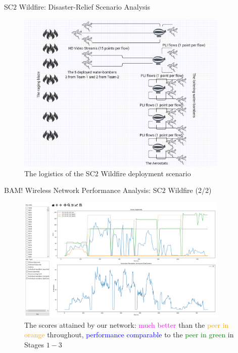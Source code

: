 \documentclass{beamer}
\begin{document}
\begin{frame}{SC$2$ Wildfire: Disaster-Relief Scenario Analysis}
    \begin{figure}
    \centering
    \includegraphics[width = 0.90\textwidth]{Wildfire_Deployment.PNG}
    \caption{The logistics of the SC$2$ Wildfire deployment scenario}
    \label{fig:18}
\end{figure}
\end{frame}
\begin{frame}{BAM! Wireless Network Performance Analysis: SC$2$ Wildfire (2/2)}
\begin{figure}
    \centering
    \includegraphics[width = 0.90\textwidth]{Wildfire_Scoring.PNG}
    \caption{The scores attained by our network: \textcolor{magenta}{much better} than the \textcolor{orange}{peer in orange} throughout, \textcolor{blue}{performance comparable} to the \textcolor{green}{peer in green} in Stages $1-3$}
    \label{fig:24}
\end{figure}
\end{frame}
\end{document}
